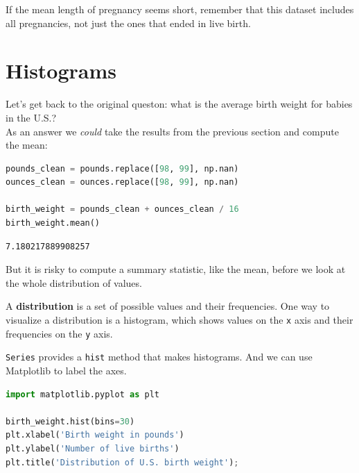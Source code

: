 If the mean length of pregnancy seems short, remember that this dataset
includes all pregnancies, not just the ones that ended in live birth.

\hypertarget{histograms}{%
\section{Histograms}\label{histograms}}

Let's get back to the original queston: what is the average birth weight
for babies in the U.S.?\\
As an answer we \emph{could} take the results from the previous section
and compute the mean:

\begin{lstlisting}[language=Python,style=source]
pounds_clean = pounds.replace([98, 99], np.nan)
ounces_clean = ounces.replace([98, 99], np.nan)

birth_weight = pounds_clean + ounces_clean / 16
birth_weight.mean()
\end{lstlisting}

\begin{lstlisting}[style=output]
7.180217889908257
\end{lstlisting}

But it is risky to compute a summary statistic, like the mean, before we
look at the whole distribution of values.

A \textbf{distribution} is a set of possible values and their
frequencies. One way to visualize a distribution is a histogram, which
shows values on the \passthrough{\lstinline!x!} axis and their
frequencies on the \passthrough{\lstinline!y!} axis.

\passthrough{\lstinline!Series!} provides a
\passthrough{\lstinline!hist!} method that makes histograms. And we can
use Matplotlib to label the axes.

\begin{lstlisting}[language=Python,style=source]
import matplotlib.pyplot as plt

birth_weight.hist(bins=30)
plt.xlabel('Birth weight in pounds')
plt.ylabel('Number of live births')
plt.title('Distribution of U.S. birth weight');
\end{lstlisting}

